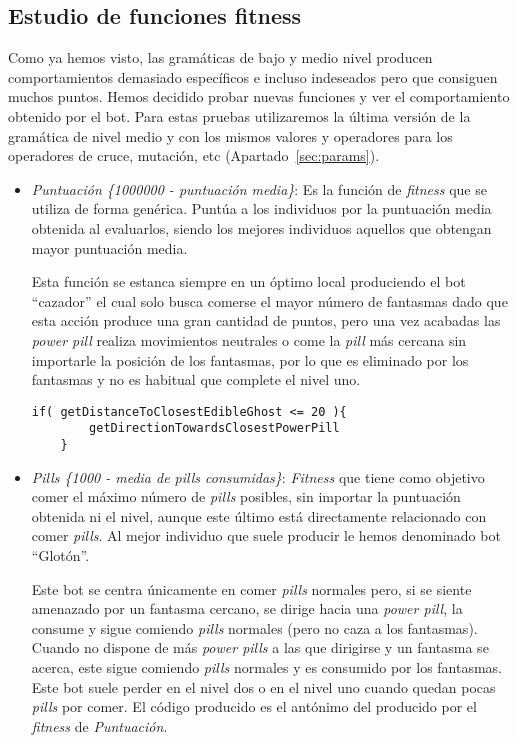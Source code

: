 \subsection{Estudio de funciones fitness}
Como ya hemos visto, las gramáticas de bajo y medio nivel producen comportamientos demasiado específicos e incluso indeseados pero que consiguen muchos puntos. Hemos decidido probar nuevas funciones y ver el comportamiento obtenido por el bot. Para estas pruebas utilizaremos la última versión de la  gramática de nivel medio y con los mismos valores y operadores para los operadores de cruce, mutación, etc (Apartado~\ref{sec:params}).
\begin{itemize}
\item \textit{Puntuación \{1000000 - puntuación media\}}: Es la función de \textit{fitness} que se utiliza de forma genérica. Puntúa a los individuos por la puntuación media obtenida al evaluarlos, siendo los mejores individuos aquellos que obtengan mayor puntuación media.

Esta función se estanca siempre en un óptimo local produciendo el bot ``cazador'' el cual solo busca comerse el mayor número de fantasmas dado que esta acción produce una gran cantidad de puntos, pero una vez acabadas las \textit{power pill} realiza movimientos neutrales o come la \textit{pill} más cercana sin importarle la posición de los fantasmas, por lo que es eliminado por los fantasmas y no es habitual que complete el nivel uno.

\begin{lstlisting}[frame=single, breaklines=no, basicstyle=\fontsize{10}{11}\ttfamily, caption=Mejor individuo obtenido mediante esta función fitness.]
    if( getDistanceToClosestEdibleGhost <= 20 ){ 
        getDirectionTowardsClosestPowerPill
    }
\end{lstlisting}

\item \textit{Pills \{1000 - media de pills consumidas\}}: \textit{Fitness} que tiene como objetivo comer el máximo número de \textit{pills} posibles, sin importar la puntuación obtenida ni el nivel, aunque este último está directamente relacionado con comer \textit{pills}. Al mejor individuo que suele producir le hemos denominado bot ``Glotón''.

Este bot se centra únicamente en comer \textit{pills} normales pero, si se siente amenazado por un fantasma cercano, se dirige hacia una \textit{power pill}, la consume y sigue comiendo \textit{pills} normales (pero no caza a los fantasmas). Cuando no dispone de más \textit{power pills} a las que dirigirse y un fantasma se acerca, este sigue comiendo \textit{pills} normales y es consumido por los fantasmas. Este bot suele perder en el nivel dos o en el nivel uno cuando quedan pocas \textit{pills} por comer. El código producido es el antónimo del producido por el \textit{fitness} de \textit{Puntuación}.


\end{itemize}
